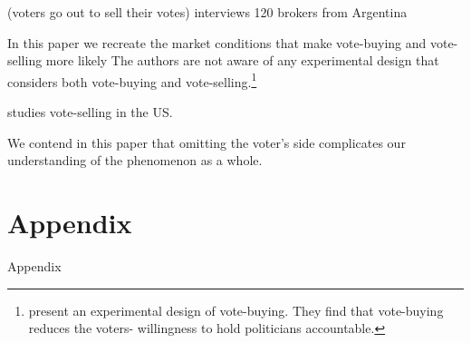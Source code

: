 \documentclass[onesided]{article}\usepackage[]{graphicx}\usepackage[]{color}
\begin{document}
\textcite{Hagene2015} (voters go out to sell their votes)
\textcite{Zarazaga2015a} interviews 120 brokers from Argentina

In this paper we recreate the market conditions that make vote-buying and vote-selling more likely  The authors are not aware of any experimental design that considers both vote-buying and vote-selling.\footnote{\textcite{Leight2020} present an experimental design of vote-buying. They find that vote-buying reduces the voters- willingness to hold politicians accountable.}

\textcite{Bahamonde2020a} studies vote-selling in the US.
 

We contend in this paper that omitting the voter's side complicates our understanding of the phenomenon as a whole. 

\clearpage
\newpage
{}
\setcounter{page}{1}
\printbibliography
\clearpage
\newpage



\clearpage



\begin{center}
\dotfill
{} \dotfill
\dotfill
{}
\end{center}

\clearpage






\setcounter{table}{0}
\renewcommand{\thetable}{A\arabic{table}}
\setcounter{figure}{0}
\renewcommand{\thefigure}{A\arabic{figure}}



\section{Appendix}
\setcounter{page}{1}

Appendix
\end{document}
